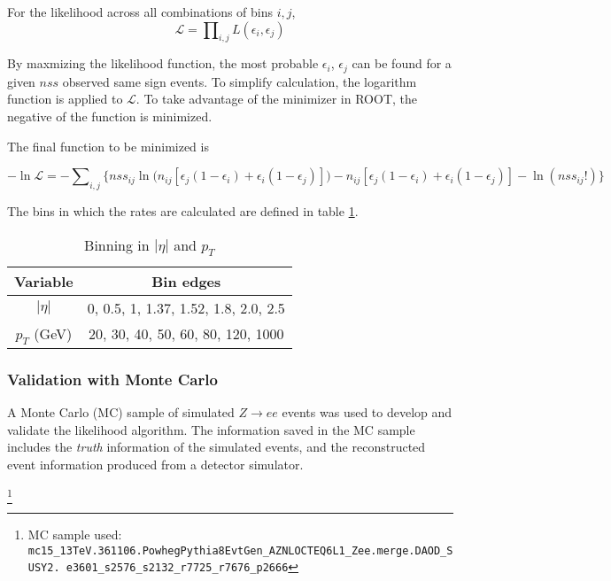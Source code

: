For the likelihood across all combinations of bins $i,j$,
\begin{equation}
\mathcal{L} = \prod\nolimits_{i,j} L(\epsilon_i, \epsilon_j)
\end{equation}

By maxmizing the likelihood function, the most probable $\epsilon_i$, $\epsilon_j$ can be found for a given $nss$ observed same sign events. To simplify calculation, the logarithm function is applied to $\mathcal{L}$. To take advantage of the minimizer in ROOT, the negative of the function is minimized. 

The final function to be minimized is 

\begin{equation}
-\ln \mathcal{L} = -\sum\nolimits_{i,j} \Big\{ {nss}_{ij} \ln\big(n_{ij}[\epsilon_j(1-\epsilon_i) + \epsilon_i(1-\epsilon_j)]\big) - n_{ij}[\epsilon_j(1-\epsilon_i) + \epsilon_i(1-\epsilon_j)] - \ln (nss_{ij}!) \Big\}
\end{equation} 

The bins in which the rates are calculated are defined in table \ref{table:binning}.

\begin{table}[h!]
\centering
\begin{tabular}{c | c}
\textbf{Variable} & \textbf{Bin edges} \\
\hline
$|\eta|$ & 0, 0.5, 1, 1.37, 1.52, 1.8, 2.0, 2.5 \\
$p_T$ (GeV) &  20, 30, 40, 50, 60, 80, 120, 1000
\end{tabular}
\caption{Binning in $|\eta|$ and $p_T$}
\label{table:binning}
\end{table}

\subsubsection*{Validation with Monte Carlo}
A Monte Carlo (MC) sample of simulated $Z \rightarrow ee$ events was used to develop and validate the likelihood algorithm. The information saved in the MC sample includes the \textit{truth} information of the simulated events, and the reconstructed event information produced from a detector simulator. 

\footnote{MC sample used: \texttt{mc15\_13TeV.361106.PowhegPythia8EvtGen\_AZNLOCTEQ6L1\_Zee.merge.DAOD\_SUSY2. e3601\_s2576\_s2132\_r7725\_r7676\_p2666}} 

